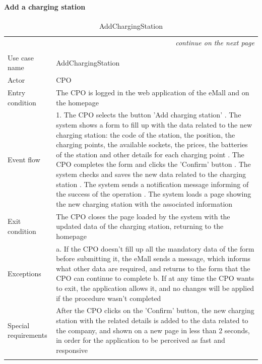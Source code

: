 \paragraph{Add a charging station}
\begin{center}
    \begin{longtable}{p{4cm} p{11cm}}
    \multicolumn{2}{r}{\itshape{continue on the next page}}\\
    \endfoot 
    \\
    \endlastfoot
    \hline
     Use case name &  AddChargingStation\\
     \hline
     Actor & CPO \\
     \hline
     Entry condition & The CPO is logged in the web application of the eMall and on the homepage \\
     \hline
     Event flow &   1. The CPO selects the button 'Add charging station' \newline
                    2. The system shows a form to fill up with the data related to the new charging station: the code of the station, the position, the charging points, the available sockets, the prices, the batteries of the station and other details for each charging point \newline
                    3. The CPO completes the form and clicks the 'Confirm' button \newline
                    4. The system checks and saves the new data related to the charging station \newline
                    5. The system sends a notification message informing of the success of the operation \newline
                    6. The system loads a page showing the new charging station with the associated information\\
     \hline
     Exit condition &  The CPO closes the page loaded by the system with the updated data of the charging station, returning to the homepage \\
     \hline
     Exceptions &   a. If the CPO doesn't fill up all the mandatory data of the form before submitting it, the eMall                sends a message, which informs what other data are required, and returns to the form that the                   CPO can continue to complete \newline
                    b. If at any time the CPO wants to exit, the application allows it, and no changes will be applied if the procedure wasn't completed \\
     \hline
     Special requirements & After the CPO clicks on the 'Confirm' button, the new charging station with the related details is added to the data related to the company, and shown on a new page in less than 2 seconds, in order for the application to be perceived as fast and responsive \\
     \hline
    \caption{AddChargingStation}
    \label{tab:AddChargingStation}
    \end{longtable}
\end{center}

